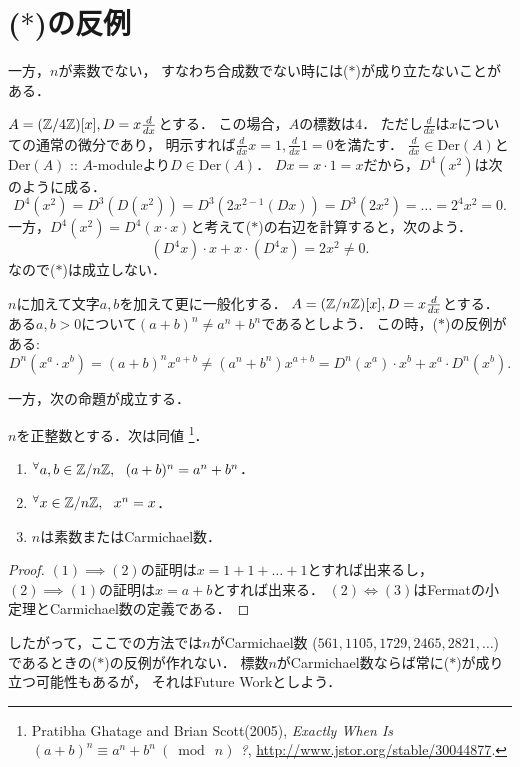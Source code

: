 \documentclass[a4paper]{jsarticle}
\newcommand{\Der}{\mathrm{Der}}
\begin{document}
\section{($*$)の反例}
一方，$n$が素数でない，
すなわち合成数でない時には($*$)が成り立たないことがある．

\begin{Example}
    $A=(\mathbb{Z}/4\mathbb{Z})[x], D=x \frac{d}{dx}$とする．
    この場合，$A$の標数は$4$．
    ただし$\frac{d}{dx}$は$x$についての通常の微分であり，
    明示すれば$\frac{d}{dx} x=1, \frac{d}{dx} 1=0$を満たす．
    $\frac{d}{dx} \in \Der(A)$と$\Der(A)$ :: $A$-moduleより$D \in \Der(A)$．
    $Dx=x \cdot 1=x$だから，$D^4(x^2)$は次のように成る．
    \[ D^4(x^2)=D^3(D(x^2))=D^3(2x^{2-1} (Dx))=D^3(2x^2)=\dots=2^4 x^2=0. \]
    一方，$D^4(x^2)=D^4(x \cdot x)$と考えて($*$)の右辺を計算すると，次のよう．
    \[ (D^4 x) \cdot x+x \cdot (D^4 x)=2x^2 \neq 0. \]
    なので($*$)は成立しない．
\end{Example}

\begin{Example}
    $n$に加えて文字$a,b$を加えて更に一般化する．
    $A=(\mathbb{Z}/n\mathbb{Z})[x], D=x \frac{d}{dx}$とする．
    ある$a,b>0$について$(a+b)^n \neq a^n+b^n$であるとしよう．
    この時，($*$)の反例がある:
    \[ D^n(x^a \cdot x^b)=(a+b)^n x^{a+b} \neq (a^n+b^n)x^{a+b}=D^n(x^a) \cdot x^b+x^a \cdot D^n(x^b). \]
\end{Example}

一方，次の命題が成立する．
\begin{Prop}
    $n$を正整数とする．次は同値
    \footnote
    {
        Pratibha Ghatage and Brian Scott(2005),
        \textit{Exactly When Is $(a + b)^{n} \equiv a^{n} + b^{n} ~(\bmod~ n)$ ?},
        \url{http://www.jstor.org/stable/30044877}.
    }．
    \begin{enumerate}[label=(\arabic*)]
        \item ${}^{\forall} a,b \in \mathbb{Z}/n\mathbb{Z},~~ (a+b)^n=a^n+b^n$．
        \item ${}^{\forall} x \in \mathbb{Z}/n\mathbb{Z},~~ x^n=x$．
        \item $n$は素数またはCarmichael数．
    \end{enumerate}
\end{Prop}
\begin{proof}
    $(1) \implies (2)$の証明は$x=1+1+\dots+1$とすれば出来るし，
    $(2) \implies (1)$の証明は$x=a+b$とすれば出来る．
    $(2) \iff (3)$はFermatの小定理とCarmichael数の定義である．
\end{proof}

したがって，ここでの方法では$n$がCarmichael数
($561, 1105, 1729, 2465, 2821, \dots$)であるときの($*$)の反例が作れない．
標数$n$がCarmichael数ならば常に($*$)が成り立つ可能性もあるが，
それはFuture Workとしよう．
\end{document}
